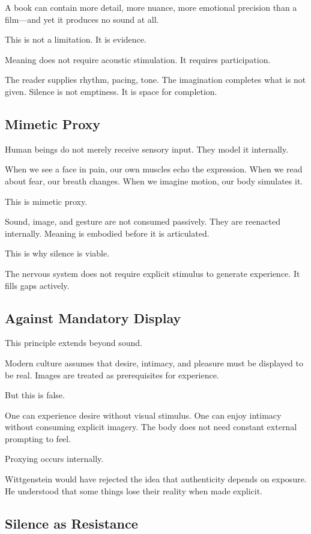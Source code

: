 \documentclass[11pt]{article}
\begin{document}
A book can contain more detail, more nuance, more emotional precision than a film—and yet it produces no sound at all.

This is not a limitation. It is evidence.

Meaning does not require acoustic stimulation. It requires participation.

The reader supplies rhythm, pacing, tone. The imagination completes what is not given. Silence is not emptiness. It is space for completion.

\subsection*{Mimetic Proxy}

Human beings do not merely receive sensory input. They model it internally.

When we see a face in pain, our own muscles echo the expression. When we read about fear, our breath changes. When we imagine motion, our body simulates it.

This is mimetic proxy.

Sound, image, and gesture are not consumed passively. They are reenacted internally. Meaning is embodied before it is articulated.

This is why silence is viable.

The nervous system does not require explicit stimulus to generate experience. It fills gaps actively.

\subsection*{Against Mandatory Display}

This principle extends beyond sound.

Modern culture assumes that desire, intimacy, and pleasure must be displayed to be real. Images are treated as prerequisites for experience.

But this is false.

One can experience desire without visual stimulus. One can enjoy intimacy without consuming explicit imagery. The body does not need constant external prompting to feel.

Proxying occurs internally.

Wittgenstein would have rejected the idea that authenticity depends on exposure. He understood that some things lose their reality when made explicit.

\subsection*{Silence as Resistance}
\end{document}

